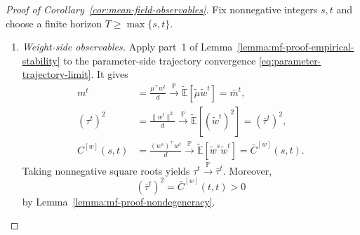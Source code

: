 \begin{proof}[Proof of Corollary~\ref{cor:mean-field-observables}]
Fix nonnegative integers $s,t$ and choose a finite horizon
$T\geq\max\{s,t\}$.

\begin{enumerate}[wide]
    \item \emph{Weight-side observables.}
    Apply part~1 of
    Lemma~\ref{lemma:mf-proof-empirical-stability}
    to the parameter-side trajectory convergence
    \eqref{eq:parameter-trajectory-limit}.
    It gives
    \[
    \begin{aligned}
        m^t
        &=
        \frac{\mu^\top w^t}{d}
        \xrightarrow{\mathbb P}
        \tilde{\mathbb E}[\tilde\mu\tilde w^t]
        =
        \bar m^t,\\
        (\tau^t)^2
        &=
        \frac{\|w^t\|^2}{d}
        \xrightarrow{\mathbb P}
        \tilde{\mathbb E}[(\tilde w^t)^2]
        =
        (\bar\tau^t)^2,\\
        C^{[w]}(s,t)
        &=
        \frac{(w^s)^\top w^t}{d}
        \xrightarrow{\mathbb P}
        \tilde{\mathbb E}[\tilde w^s\tilde w^t]
        =
        \bar C^{[w]}(s,t).
    \end{aligned}
    \]
    Taking nonnegative square roots yields
    $\tau^t\xrightarrow{\mathbb P}\bar\tau^t$.
    Moreover,
    \[
        (\bar\tau^t)^2=\bar C^{[w]}(t,t)>0
    \]
    by Lemma~\ref{lemma:mf-proof-nondegeneracy}.


\end{enumerate}
\end{proof}
